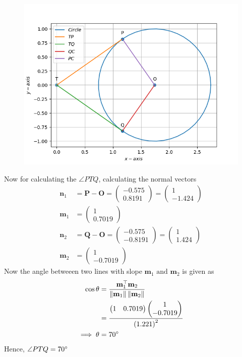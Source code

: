 \documentclass[12pt]{article}
\providecommand{\brak}[1]{\ensuremath{\left(#1\right)}}
\providecommand{\norm}[1]{\left\lVert#1\right\rVert}
\newcommand{\myvec}[1]{\ensuremath{\begin{pmatrix}#1\end{pmatrix}}}
\let\vec\mathbf
\begin{document}
\begin{figure}[!h]
	\begin{center} 
	    \includegraphics[width=\columnwidth]{figs/tan2}
	\end{center}
\caption{}
\label{fig:Fig1}
\end{figure}
Now for calculating the $\angle{PTQ}$, calculating the normal vectors
\begin{align}
	\vec{n}_1 &= \vec{P}-\vec{O} = \myvec{-0.575\\0.8191} = \myvec{1\\-1.424}\\
	\vec{m}_1 &= \myvec{1\\0.7019}\\
	\vec{n}_2 &= \vec{Q}-\vec{O} = \myvec{-0.575\\-0.8191} = \myvec{1\\1.424}\\
	\vec{m}_2 &= \myvec{1\\-0.7019}
\end{align}
Now the angle betweeen two lines with slope $\vec{m}_1 \text{ and } \vec{m}_2$ is given as
\begin{align}
	\cos\theta &= \frac{\vec{m}_1 ^\top \vec{m}_2}{\norm{\vec{m}_1}\norm{\vec{m}_2}}\\
	&=\frac{\myvec{1&0.7019}\myvec{1\\-0.7019}}{\brak{1.221}^2}\\
	\implies \theta &= 70\degree
\end{align}
Hence, $\angle{PTQ} = 70\degree$
\end{document}
